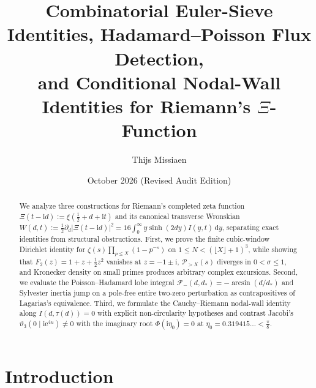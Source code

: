 \documentclass[11pt,reqno]{amsart}
\title[Euler-Sieve Identities, Hadamard Flux Detection, and Nodal Walls]{Combinatorial Euler-Sieve Identities, Hadamard--Poisson Flux Detection,\\ and Conditional Nodal-Wall Identities for Riemann's $\Xi$-Function}
\author{Thijs Missiaen}
\date{October 2026 (Revised Audit Edition)}
\theoremstyle{plain}
\theoremstyle{definition}
\theoremstyle{remark}
\numberwithin{equation}{section}
\newcommand{\dd}{\,\mathrm{d}}
\newcommand{\ii}{\mathrm{i}}
\newcommand{\ee}{\mathrm{e}}
\begin{document}
\begin{abstract}
We analyze three constructions for Riemann's completed zeta function $\Xi(t - \ii d) := \xi(\frac{1}{2} + d + \ii t)$ and its canonical transverse Wronskian $W(d,t) := \frac{1}{2}\partial_d\lvert\Xi(t - \ii d)\rvert^2 = 16\int_0^\infty y\sinh(2dy)I(y,t)\dd y$, separating exact identities from structural obstructions. First, we prove the finite cubic-window Dirichlet identity for $\zeta(s)\prod_{p \le X}(1 - p^{-s})$ on $1 \le N < (\lfloor X\rfloor + 1)^3$, while showing that $F_2(z) = 1 + z + \frac{1}{2}z^2$ vanishes at $z = -1 \pm \ii$, $\mathcal{P}_{>X}(s)$ diverges in $0 < \sigma \le 1$, and Kronecker density on small primes produces arbitrary complex excursions. Second, we evaluate the Poisson--Hadamard lobe integral $\mathcal{F}_-(d, d_*) = -\arcsin(d/d_*)$ and Sylvester inertia jump on a pole-free entire two-zero perturbation as contrapositives of Lagarias's equivalence. Third, we formulate the Cauchy--Riemann nodal-wall identity along $I(d, \tau(d)) = 0$ with explicit non-circularity hypotheses and contrast Jacobi's $\vartheta_3(0 \mid \ii\ee^{4u}) \neq 0$ with the imaginary root $\Phi(\ii\eta_0) = 0$ at $\eta_0 = 0.319415\dots < \frac{\pi}{8}$.
\end{abstract}

\maketitle

\section{Introduction}\label{sec:intro}
\end{document}
